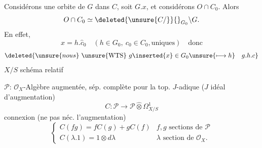 
Considérons une orbite de $G$ dans $C$, soit $G.x$, et considérons $O\cap C_0$. Alors
\[O\cap C_0\simeq\deleted{\unsure{C/}}{}_{G_0}\backslash G.\]
En effet, 
\[x=h.\hat c_0\quad(h\in G_0,\ c_0\in C_0,\text{uniques})\quad\text{donc}\]
\[\deleted{\unsure{nous}\ \unsure{\mathrm{WTS}}\ g\inserted{x}\in G_0\unsure{\longmapsto h}\quad g.h.c}\]
$X/S$ schéma relatif

$\mathcal P$: $\mathcal O_X$-Algèbre augmentée, sép. complète pour la top. $J$-adique ($J$ idéal d'augmentation)
\[
C:\mathcal P\longrightarrow\mathcal P\widehat\otimes\Omega^1_{X/S}
\]
connexion  (ne  pas néc. l'augmentation)
\[
\begin{cases}
C(fg)=fC(g)+gC(f)& f,g\text{ sections de }\mathcal P\\
C(\lambda.1)=1\otimes d\lambda&\lambda\text{ section de }\mathcal O_X.
\end{cases}
\]

